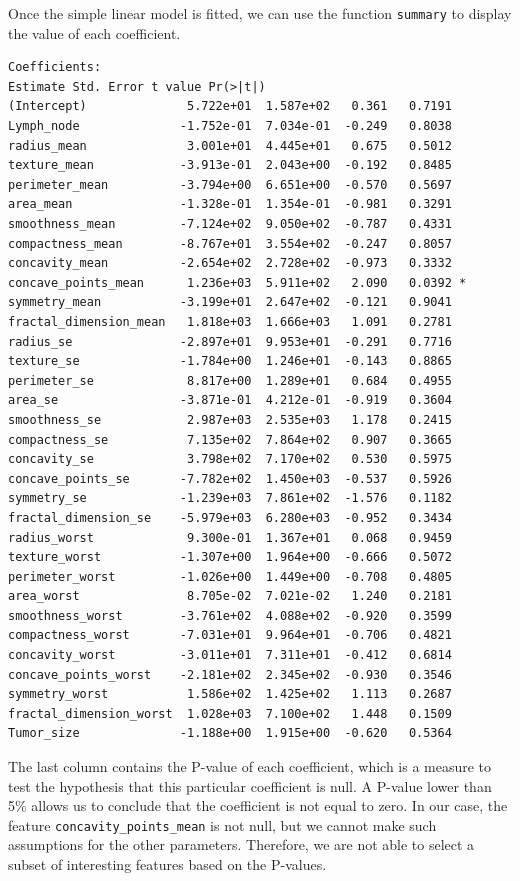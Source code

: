 \documentclass[]{report}
\begin{document}
Once the simple linear model is fitted, we can use the function \texttt{summary} to display the value of each coefficient.
\begin{verbatim}
Coefficients:
Estimate Std. Error t value Pr(>|t|)  
(Intercept)              5.722e+01  1.587e+02   0.361   0.7191  
Lymph_node              -1.752e-01  7.034e-01  -0.249   0.8038  
radius_mean              3.001e+01  4.445e+01   0.675   0.5012  
texture_mean            -3.913e-01  2.043e+00  -0.192   0.8485  
perimeter_mean          -3.794e+00  6.651e+00  -0.570   0.5697  
area_mean               -1.328e-01  1.354e-01  -0.981   0.3291  
smoothness_mean         -7.124e+02  9.050e+02  -0.787   0.4331  
compactness_mean        -8.767e+01  3.554e+02  -0.247   0.8057  
concavity_mean          -2.654e+02  2.728e+02  -0.973   0.3332  
concave_points_mean      1.236e+03  5.911e+02   2.090   0.0392 *
symmetry_mean           -3.199e+01  2.647e+02  -0.121   0.9041  
fractal_dimension_mean   1.818e+03  1.666e+03   1.091   0.2781  
radius_se               -2.897e+01  9.953e+01  -0.291   0.7716  
texture_se              -1.784e+00  1.246e+01  -0.143   0.8865  
perimeter_se             8.817e+00  1.289e+01   0.684   0.4955  
area_se                 -3.871e-01  4.212e-01  -0.919   0.3604  
smoothness_se            2.987e+03  2.535e+03   1.178   0.2415  
compactness_se           7.135e+02  7.864e+02   0.907   0.3665  
concavity_se             3.798e+02  7.170e+02   0.530   0.5975  
concave_points_se       -7.782e+02  1.450e+03  -0.537   0.5926  
symmetry_se             -1.239e+03  7.861e+02  -1.576   0.1182  
fractal_dimension_se    -5.979e+03  6.280e+03  -0.952   0.3434  
radius_worst             9.300e-01  1.367e+01   0.068   0.9459  
texture_worst           -1.307e+00  1.964e+00  -0.666   0.5072  
perimeter_worst         -1.026e+00  1.449e+00  -0.708   0.4805  
area_worst               8.705e-02  7.021e-02   1.240   0.2181  
smoothness_worst        -3.761e+02  4.088e+02  -0.920   0.3599  
compactness_worst       -7.031e+01  9.964e+01  -0.706   0.4821  
concavity_worst         -3.011e+01  7.311e+01  -0.412   0.6814  
concave_points_worst    -2.181e+02  2.345e+02  -0.930   0.3546  
symmetry_worst           1.586e+02  1.425e+02   1.113   0.2687  
fractal_dimension_worst  1.028e+03  7.100e+02   1.448   0.1509  
Tumor_size              -1.188e+00  1.915e+00  -0.620   0.5364  
\end{verbatim}

The last column contains the P-value of each coefficient, which is a measure to test the hypothesis that this particular coefficient is null. A P-value lower than 5\% allows us to conclude that the coefficient is not equal to zero. In our case, the feature \texttt{concavity\_points\_mean} is not null, but we cannot make such assumptions for the other parameters. Therefore, we are not able to select a subset of interesting features based on the P-values. \\
\end{document}
